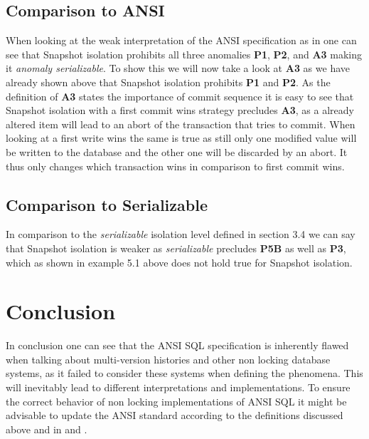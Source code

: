 \documentclass[sigconf, review=false]{acmart}
\begin{document}
\subsection{Comparison to ANSI}
When looking at the weak interpretation of the ANSI specification as in \cite{Adya_Liskov_O_Neil_2000}
one can see that Snapshot isolation prohibits all three anomalies \textbf{P1}, \textbf{P2}, and \textbf{A3} making it \emph{anomaly \emph{serializable}}.
To show this we will now take a look at \textbf{A3} as we have already shown above that Snapshot isolation prohibits \textbf{P1} and \textbf{P2}.
As the definition of \textbf{A3} states the importance of commit sequence it is easy to see that Snapshot isolation with a first commit wins
strategy precludes \textbf{A3}, as a already altered item will lead to an abort of the transaction that tries to commit.
When looking at a first write wins the same is true as still only one modified value will
be written to the database and the other one will be discarded by an abort. It thus only changes
which transaction wins in comparison to first commit wins.
\subsection{Comparison to Serializable}
In comparison to the \emph{serializable} isolation level defined in section 3.4 we can say that Snapshot isolation is
weaker as \emph{serializable} precludes \textbf{P5B} as well as \textbf{P3}, which as shown in example 5.1 above does not hold true
for Snapshot isolation.
\section{Conclusion}

In conclusion one can see that the ANSI SQL specification is inherently flawed when talking
about multi-version histories and other non locking database systems, as it failed to consider
these systems when defining the phenomena. This will inevitably lead to different interpretations
and implementations. To ensure the correct behavior of non locking implementations of ANSI SQL it might be advisable to update the ANSI standard
according to the definitions discussed above and in \cite{Adya_Liskov_O_Neil_2000} and \cite{Berenson_Bernstein_Gray_Melton_O_Neil_O_Neil_1995}.


\end{document}
